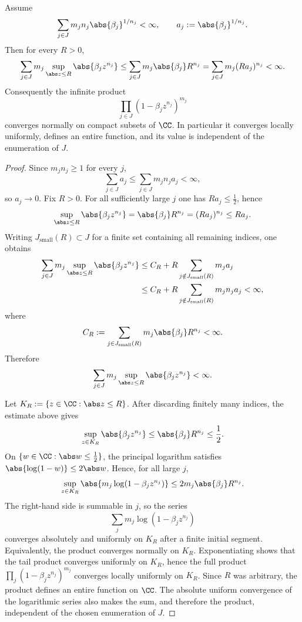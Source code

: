\begin{lemma}
  \label{lem:direct-cyclic-weierstrass-product}
  Assume
  \[
    \sum_{j\in J}m_j n_j\abs{\beta_j}^{1/n_j}<\infty,
    \qquad
    a_j:=\abs{\beta_j}^{1/n_j}.
  \]
  Then for every \(R>0\),
  \[
    \sum_{j\in J} m_j \sup_{\abs z\le R}\abs{\beta_j z^{n_j}}
    \le \sum_{j\in J}m_j\abs{\beta_j}R^{n_j}
    =\sum_{j\in J}m_j(Ra_j)^{n_j}
    <\infty.
  \]
  Consequently the infinite product
  \[
    \prod_{j\in J}(1-\beta_j z^{n_j})^{m_j}
  \]
  converges normally on compact subsets of \(\CC\). In particular it
  converges locally uniformly, defines an entire function, and its value
  is independent of the enumeration of \(J\).
\end{lemma}

\begin{proof}
  Since \(m_jn_j\ge1\) for every \(j\),
  \[
    \sum_{j\in J} a_j
    \le \sum_{j\in J} m_jn_j a_j
    <\infty,
  \]
  so \(a_j\to0\). Fix \(R>0\). For all sufficiently large \(j\) one has
  \(Ra_j\le\frac12\), hence
  \[
    \sup_{\abs z\le R}\abs{\beta_j z^{n_j}}
    =\abs{\beta_j}R^{n_j}
    =(Ra_j)^{n_j}
    \le Ra_j.
  \]
  Writing \(J_{\mathrm{small}}(R)\subset J\) for a finite set containing
  all remaining indices, one obtains
  \begin{align*}
    \sum_{j\in J} m_j \sup_{\abs z\le R}\abs{\beta_j z^{n_j}}
    &\le C_R+R\sum_{j\notin J_{\mathrm{small}}(R)}m_j a_j \\
    &\le C_R+R\sum_{j\notin J_{\mathrm{small}}(R)}m_jn_j a_j
    <\infty,
  \end{align*}
  where
  \[
    C_R:=\sum_{j\in J_{\mathrm{small}}(R)}
    m_j\abs{\beta_j}R^{n_j}<\infty.
  \]
  Therefore
  \[
    \sum_{j\in J} m_j \sup_{\abs z\le R}\abs{\beta_j z^{n_j}}<\infty.
  \]

  Let \(K_R:=\{z\in\CC:\abs z\le R\}\). After discarding finitely many
  indices, the estimate above gives
  \[
    \sup_{z\in K_R}\abs{\beta_j z^{n_j}}
    \le \abs{\beta_j}R^{n_j}
    \le \frac12.
  \]
  On \(\{w\in\CC:\abs w\le \frac12\}\), the principal logarithm satisfies
  \(\abs{\log(1-w)}\le 2\abs w\). Hence, for all large \(j\),
  \[
    \sup_{z\in K_R}
    \abs{m_j\log(1-\beta_j z^{n_j})}
    \le 2m_j\abs{\beta_j}R^{n_j}.
  \]
  The right-hand side is summable in \(j\), so the series
  \[
    \sum_j m_j\log(1-\beta_j z^{n_j})
  \]
  converges absolutely and uniformly on \(K_R\) after a finite initial
  segment. Equivalently, the product converges normally on \(K_R\).
  Exponentiating shows that the tail product converges uniformly on
  \(K_R\), hence the full product
  \(\prod_j(1-\beta_j z^{n_j})^{m_j}\) converges locally uniformly on
  \(K_R\). Since \(R\) was arbitrary, the product defines an entire
  function on \(\CC\). The absolute uniform convergence of the logarithmic
  series also makes the sum, and therefore the product, independent of the
  chosen enumeration of \(J\).
\end{proof}

